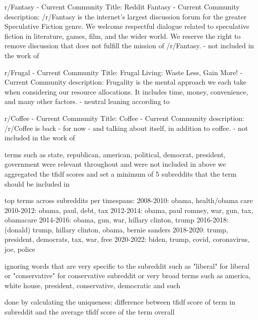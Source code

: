 r/Fantasy
- Current Community Title: Reddit Fantasy
- Current Community description: /r/Fantasy is the internet’s largest discussion forum for the greater Speculative Fiction genre. We welcome respectful dialogue related to speculative fiction in literature, games, film, and the wider world. We reserve the right to remove discussion that does not fulfill the mission of /r/Fantasy.
- not included in the work of \cite{waller2021quantifying}

r/Frugal
- Current Community Title: Frugal Living: Waste Less, Gain More!
- Current Community description: Frugality is the mental approach we each take when considering our resource allocations. It includes time, money, convenience, and many other factors.
- neutral leaning according to \cite{waller2021quantifying}

r/Coffee
- Current Community Title: Coffee
- Current Community description: /r/Coffee is back - for now - and talking about itself, in addition to coffee.
- not included in the work of \cite{waller2021quantifying}







terms such as state, republican, american, political, democrat, president, government were relevant throughout and were not included in above
we aggregated the tfidf scores and set a minimum of 5 subreddits that the term should be included in


top terms across subreddits per timespans:
2008-2010: obama, health/obama care
2010-2012: obama, paul, debt, tax
2012-2014: obama, paul romney, war, gun, tax, obamacare
2014-2016: obama, gun, war, hillary clinton, trump
2016-2018: (donald) trump, hillary clinton, obama, bernie sanders
2018-2020: trump, president, democrats, tax, war, free
2020-2022: biden, trump, covid, coronavirus, joe, police


ignoring words that are very specific to the subreddit such as "liberal" for liberal or "conservative" for conservative subreddit or very broad terms such as america, white house, president, conservative, democratic and such

done by calculating the uniqueness: difference between tfidf score of term in subreddit and the average tfidf score of the term overall

